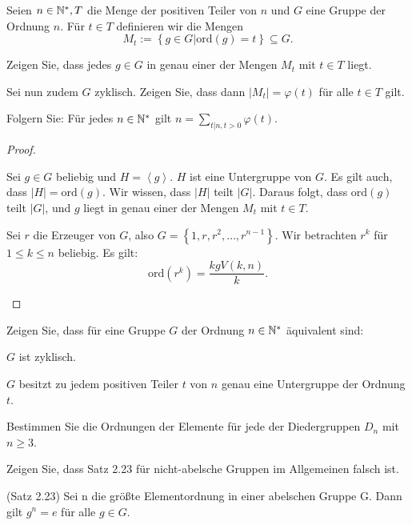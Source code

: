 \begin{Problem}
	Seien $n\in \mathbb{N}^*, T$ die Menge der positiven Teiler von $n$ und $G$ eine Gruppe der Ordnung $n$. F\"{u}r $t\in T$ definieren wir die Mengen
	\[
		M_t:=\left\{ g\in G|\text{ord}(g)=t \right\} \subseteq G
	.\] 
	\begin{parts}
		\item Zeigen Sie, dass jedes $g\in G$ in genau einer der Mengen $M_t$ mit $t\in T$ liegt.
		\item Sei nun zudem $G$ zyklisch. Zeigen Sie, dass dann $|M_t|=\varphi(t)$ f\"{u}r alle $t\in T$ gilt.
		\item Folgern Sie: F\"{u}r jedes $n\in \mathbb{N}^*$ gilt $n=\sum_{t|n, t>0}\varphi(t)$.
	\end{parts}
\end{Problem}
\begin{proof}
	\begin{parts}
	\item Sei $g\in G$ beliebig und $H=\left<g \right>$. $H$ ist eine Untergruppe von $G$. Es gilt auch, dass $|H|=\text{ord}(g)$. Wir wissen, dass $|H|$ teilt $|G|$. Daraus folgt, dass $\text{ord}(g)$ teilt $|G|$, und $g$ liegt in genau einer der Mengen $M_t$ mit $t\in T$.
	\item Sei $r$ die Erzeuger von $G$, also $G=\left\{1, r,r^2,\dots,r^{n-1} \right\} $. Wir betrachten $r^k$ f\"{u}r $1\le k \le n$ beliebig. Es gilt:
		\[
			\text{ord}(r^k)=\frac{kgV(k,n)}{k}
		.\] 
	\end{parts}
\end{proof}
\begin{Problem}
	Zeigen Sie, dass für eine Gruppe $G$ der Ordnung $n \in \mathbb{N}^*$ äquivalent sind:
	\begin{parts}
	\item $G$ ist zyklisch.
	\item $G$ besitzt zu jedem positiven Teiler $t$ von $n$ genau eine Untergruppe der Ordnung $t$.
	\end{parts}
\end{Problem}

\begin{Problem}
	\begin{parts}
	\item  Bestimmen Sie die Ordnungen der Elemente für jede der Diedergruppen $D_n$ mit $n\ge 3$.
	\item  Zeigen Sie, dass Satz 2.23 für nicht-abelsche Gruppen im Allgemeinen falsch ist.
		\begin{tcolorbox}
			(Satz 2.23) Sei n die größte Elementordnung in einer abelschen Gruppe G. Dann gilt $g^n = e$ für alle $g \in G$.
		\end{tcolorbox}
	\end{parts}
\end{Problem}

